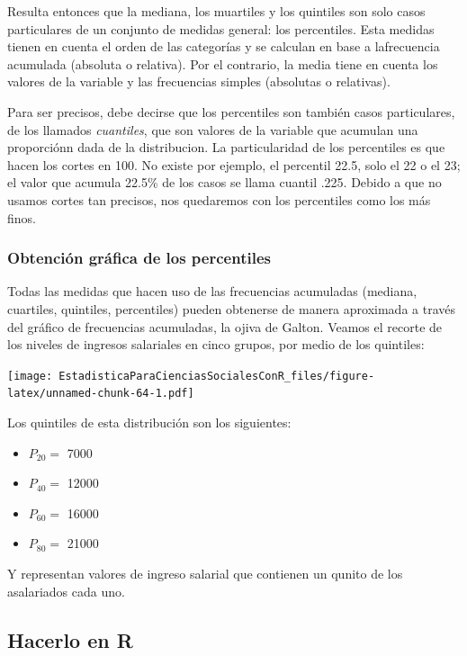 \documentclass[]{book}
\providecommand{\tightlist}{%
  \setlength{\itemsep}{0pt}\setlength{\parskip}{0pt}}
\begin{document}
Resulta entonces que la mediana, los muartiles y los quintiles son solo casos particulares de un conjunto de medidas general: los percentiles. Esta medidas tienen en cuenta el orden de las categorías y se calculan en base a lafrecuencia acumulada (absoluta o relativa). Por el contrario, la media tiene en cuenta los valores de la variable y las frecuencias simples (absolutas o relativas).

Para ser precisos, debe decirse que los percentiles son también casos particulares, de los llamados \emph{cuantiles}, que son valores de la variable que acumulan una proporciónn dada de la distribucion. La particularidad de los percentiles es que hacen los cortes en 100. No existe por ejemplo, el percentil 22.5, solo el 22 o el 23; el valor que acumula 22.5\% de los casos se llama cuantil .225. Debido a que no usamos cortes tan precisos, nos quedaremos con los percentiles como los más finos.

\hypertarget{obtencion-grafica-de-los-percentiles}{%
\subsubsection{Obtención gráfica de los percentiles}\label{obtencion-grafica-de-los-percentiles}}

Todas las medidas que hacen uso de las frecuencias acumuladas (mediana, cuartiles, quintiles, percentiles) pueden obtenerse de manera aproximada a través del gráfico de frecuencias acumuladas, la ojiva de Galton. Veamos el recorte de los niveles de ingresos salariales en cinco grupos, por medio de los quintiles:

\texttt{[image: EstadisticaParaCienciasSocialesConR\_files/figure-latex/unnamed-chunk-64-1.pdf]}

Los quintiles de esta distribución son los siguientes:

\begin{itemize}
\tightlist
\item
  \(P_{20} =\) 7000
\item
  \(P_{40} =\) 12000
\item
  \(P_{60} =\) 16000
\item
  \(P_{80} =\) 21000
\end{itemize}

Y representan valores de ingreso salarial que contienen un qunito de los asalariados cada uno.

\hypertarget{hacerlo-en-r}{%
\subsection{Hacerlo en R}\label{hacerlo-en-r}}
\end{document}
